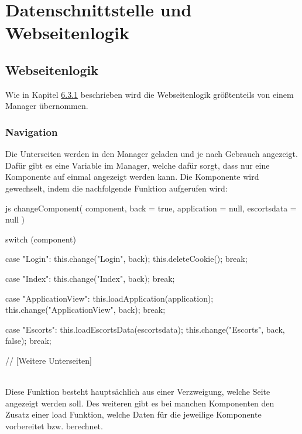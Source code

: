 \section{Datenschnittstelle und Webseitenlogik}
\subsection{Webseitenlogik}
Wie in Kapitel \hyperref[sec:webseitenlogik]{6.3.1} beschrieben wird die Webseitenlogik größtenteils von einem Manager übernommen.

\subsubsection{Navigation}
\label{sec:navigation}
Die Unterseiten werden in den Manager geladen und je nach Gebrauch angezeigt. Dafür gibt es eine Variable im Manager, welche dafür sorgt, dass nur eine Komponente auf einmal angezeigt werden kann. Die Komponente wird gewechselt, indem die nachfolgende Funktion aufgerufen wird:
\begin{code}{js}
	changeComponent(
	component,
	back = true,
	application = null,
	escortsdata = null
	) {
		switch (component) {
			case "Login":
			this.change("Login", back);
			this.deleteCookie();
			break;
			
			case "Index":
			this.change("Index", back);
			break;
			
			case "ApplicationView":
			this.loadApplication(application);
			this.change("ApplicationView", back);
			break;
			
			case "Escorts":
			this.loadEscortsData(escortsdata);
			this.change("Escorts", back, false);
			break;
			
			// [Weitere Unterseiten]
		}
	}
\end{code}
~\\
\newpage
Diese Funktion besteht hauptsächlich aus einer Verzweigung, welche Seite angezeigt werden soll.
Des weiteren gibt es bei manchen Komponenten den Zusatz einer load Funktion, welche Daten für die jeweilige Komponente vorbereitet bzw. berechnet.

